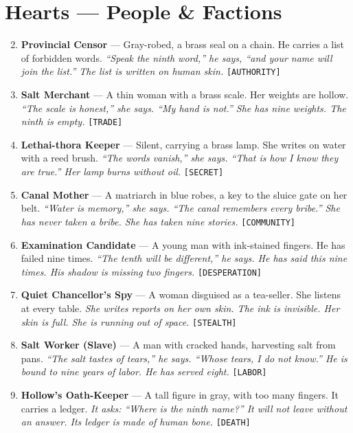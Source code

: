 \section*{Hearts --- People \& Factions}
\label{sec:sihai-people}
\begin{enumerate}
\setcounter{enumi}{1}
\item \textbf{Provincial Censor} --- Gray-robed, a brass seal on a chain. He carries a list of forbidden words.
  \hfill \textit{``Speak the ninth word,'' he says, ``and your name will join the list.'' The list is written on human skin.} \texttt{[AUTHORITY]}
\item \textbf{Salt Merchant} --- A thin woman with a brass scale. Her weights are hollow.
  \hfill \textit{``The scale is honest,'' she says. ``My hand is not.'' She has nine weights. The ninth is empty.} \texttt{[TRADE]}
\item \textbf{Lethai-thora Keeper} --- Silent, carrying a brass lamp. She writes on water with a reed brush.
  \hfill \textit{``The words vanish,'' she says. ``That is how I know they are true.'' Her lamp burns without oil.} \texttt{[SECRET]}
\item \textbf{Canal Mother} --- A matriarch in blue robes, a key to the sluice gate on her belt.
  \hfill \textit{``Water is memory,'' she says. ``The canal remembers every bribe.'' She has never taken a bribe. She has taken nine stories.} \texttt{[COMMUNITY]}
\item \textbf{Examination Candidate} --- A young man with ink-stained fingers. He has failed nine times.
  \hfill \textit{``The tenth will be different,'' he says. He has said this nine times. His shadow is missing two fingers.} \texttt{[DESPERATION]}
\item \textbf{Quiet Chancellor's Spy} --- A woman disguised as a tea-seller. She listens at every table.
  \hfill \textit{She writes reports on her own skin. The ink is invisible. Her skin is full. She is running out of space.} \texttt{[STEALTH]}
\item \textbf{Salt Worker (Slave)} --- A man with cracked hands, harvesting salt from pans.
  \hfill \textit{``The salt tastes of tears,'' he says. ``Whose tears, I do not know.'' He is bound to nine years of labor. He has served eight.} \texttt{[LABOR]}
\item \textbf{Hollow's Oath-Keeper} --- A tall figure in gray, with too many fingers. It carries a ledger.
  \hfill \textit{It asks: ``Where is the ninth name?'' It will not leave without an answer. Its ledger is made of human bone.} \texttt{[DEATH]}

\end{enumerate}
